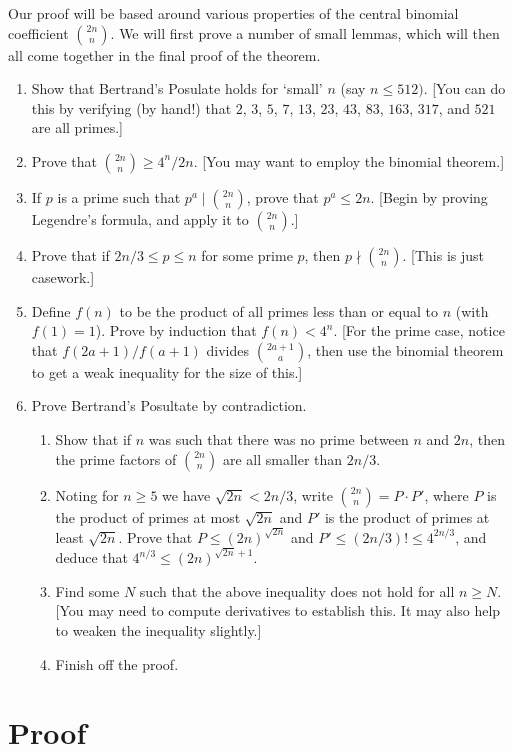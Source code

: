 \documentclass[11pt, a4paper, reqno]{amsart}
\theoremstyle{definition}
\begin{document}
Our proof will be based around various properties of the central binomial coefficient $\binom{2n}{n}$. We will first prove a number of small lemmas, which will then all come together in the final proof of the theorem. 
\begin{enumerate}
	\item Show that Bertrand's Posulate holds for `small' $n$ (say $n \leq 512)$. [You can do this by verifying (by hand!) that $2$, $3$, $5$, $7$, $13$, $23$, $43$, $83$, $163$, $317$, and $521$ are all primes.]
	\item Prove that $\binom{2n}{n} \geq 4^n/2n$. [You may want to employ the binomial theorem.]
	\item If $p$ is a prime such that $p^a \mid \binom{2n}{n}$, prove that $p^a \leq 2n$. [Begin by proving Legendre's formula, and apply it to $\binom{2n}{n}$.]
	\item Prove that if $2n/3 \leq p \leq n$ for some prime $p$, then $p \nmid \binom{2n}{n}$. [This is just casework.]
	\item Define $f(n)$ to be the product of all primes less than or equal to $n$ (with $f(1) = 1$). Prove by induction that $f(n) < 4^n$. [For the prime case, notice that $f(2a + 1)/f(a + 1)$ divides $\binom{2a + 1}{a}$, then use the binomial theorem to get a weak inequality for the size of this.]
	\item Prove Bertrand's Posultate by contradiction.
	\begin{enumerate}
		\item Show that if $n$ was such that there was no prime between $n$ and $2n$, then the prime factors of $\binom{2n}{n}$ are all smaller than $2n/3$.
		\item Noting for $n \geq 5$ we have $\sqrt{2n} < 2n/3$, write $\binom{2n}{n} = P\cdot P'$, where $P$ is the product of primes at most $\sqrt{2n}$ and $P'$ is the product of primes at least $\sqrt{2n}$. Prove that $P \leq (2n)^{\sqrt{2n}}$ and $P' \leq (2n/3)! \leq 4^{2n/3}$, and deduce that  $4^{n/3} \leq (2n)^{\sqrt{2n}+1}$.
		\item Find some $N$ such that the above inequality does not hold for all $n \geq N$. [You may need to compute derivatives to establish this. It may also help to weaken the inequality slightly.] 
		\item Finish off the proof.
	\end{enumerate}
\end{enumerate}
\clearpage
\section*{Proof}
\end{document}
